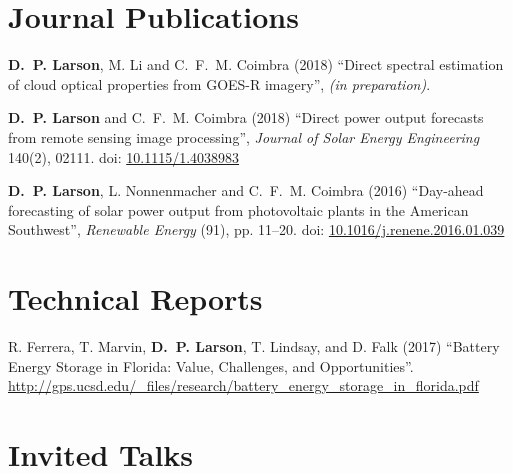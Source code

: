 \documentclass[10pt]{res}
\begin{document}
\begin{resume}
\section{Journal Publications}
\vspace{0.1in}



\textbf{D.~P. Larson}, M. Li and C.~F.~M. Coimbra (2018) ``Direct spectral estimation of cloud optical properties from GOES-R imagery'', \textit{(in preparation)}.

\textbf{D.~P. Larson} and C.~F.~M. Coimbra (2018) ``Direct power output forecasts from remote sensing image processing'', \textit{Journal of Solar Energy Engineering} 140(2), 02111. doi: \href{http://dx.doi.org/10.1115/1.4038983}{10.1115/1.4038983}

\textbf{D.~P. Larson}, L. Nonnenmacher and C.~F.~M. Coimbra (2016) ``Day-ahead forecasting of solar power output from photovoltaic plants in the American Southwest'', \textit{Renewable Energy} (91), pp. 11--20. doi: \href{http://dx.doi.org/10.1016/j.renene.2016.01.039}{10.1016/j.renene.2016.01.039}


%
\section{Technical Reports}
\vspace{0.1in}

R. Ferrera, T. Marvin, \textbf{D.~P. Larson}, T. Lindsay, and D. Falk (2017) ``Battery Energy Storage in Florida: Value, Challenges, and Opportunities''. \url{http://gps.ucsd.edu/_files/research/battery_energy_storage_in_florida.pdf}


\section{Invited Talks}
\vspace{0.1in}


\end{resume}
\end{document}
